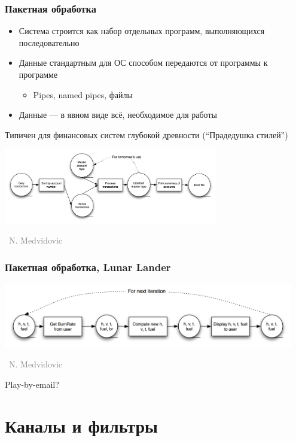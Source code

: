 \documentclass[xetex,mathserif,serif]{beamer}
\newcommand{\attribution}[1] {
    \vspace{-5mm}\begin{flushright}\begin{scriptsize}\textcolor{gray}{\textcopyright\, #1}\end{scriptsize}\end{flushright}
}
\begin{document}
    \begin{frame}
        \frametitle{Пакетная обработка}
        \begin{itemize}
            \item Система строится как набор отдельных программ, выполняющихся последовательно
            \item Данные стандартным для ОС способом передаются от программы к программе
            \begin{itemize}
                \item Pipes, named pipes, файлы
            \end{itemize}
            \item Данные --- в явном виде всё, необходимое для работы
        \end{itemize}
        Типичен для финансовых систем глубокой древности (``Прадедушка стилей'')
        \begin{center}
            \includegraphics[width=0.7\textwidth]{batch.png}
            \attribution{N. Medvidovic}
        \end{center}
    \end{frame}

    \begin{frame}
        \frametitle{Пакетная обработка, Lunar Lander}
        \begin{center}
            \includegraphics[width=0.95\textwidth]{batchLL.png}
            \attribution{N. Medvidovic}
        \end{center}
        Play-by-email?
    \end{frame}

    \section{Каналы и фильтры}
\end{document}
